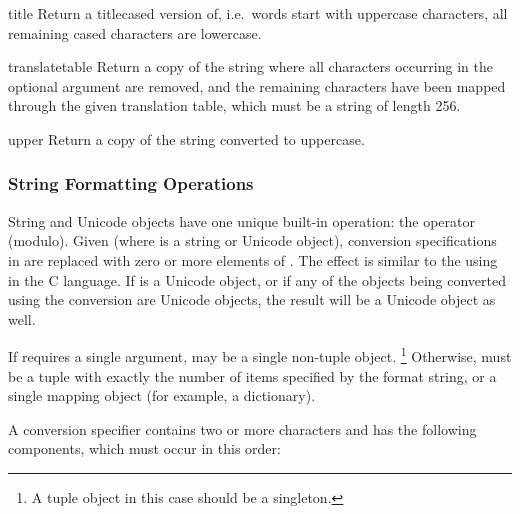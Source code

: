 \begin{methoddesc}[string]{title}{}
Return a titlecased version of, i.e.\ words start with uppercase
characters, all remaining cased characters are lowercase.
\end{methoddesc}

\begin{methoddesc}[string]{translate}{table}
Return a copy of the string where all characters occurring in the
optional argument  are removed, and the remaining
characters have been mapped through the given translation table, which
must be a string of length 256.
\end{methoddesc}

\begin{methoddesc}[string]{upper}{}
Return a copy of the string converted to uppercase.
\end{methoddesc}


\subsubsection{String Formatting Operations \label{typesseq-strings}}


String and Unicode objects have one unique built-in operation: the
\code{\%} operator (modulo).  Given  (where  is a string or Unicode object),
\code{\%} conversion specifications in  are replaced with
zero or more elements of .  The effect is similar to the
using  in the C language.  If  is a
Unicode object, or if any of the objects being converted using the
 conversion are Unicode objects, the result will be a
Unicode object as well.

If  requires a single argument,  may be a
single non-tuple object. \footnote{A tuple object in this case should
  be a singleton.}  Otherwise,  must be a tuple with
exactly the number of items specified by the format string, or a
single mapping object (for example, a dictionary).

A conversion specifier contains two or more characters and has the
following components, which must occur in this order:

